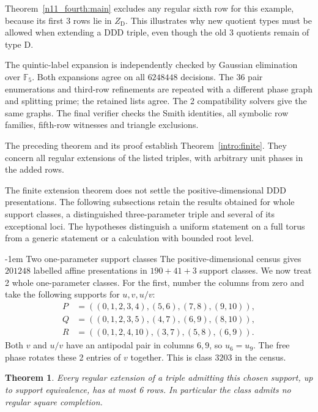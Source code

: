 \documentclass[11pt,a4paper]{article}
\makeatletter
\newtheorem{theorem}{Theorem}[section]
\theoremstyle{plain}
\theoremstyle{definition}
\theoremstyle{plain}
\renewcommand\subsection{\@startsection{subsection}{2}{\z@}  {\medskipamount}  {-1em}  {\normalfont\normalsize\bfseries}}
\makeatother
\begin{document}
Theorem~\ref{n11_fourth:main} excludes any regular sixth row for this example, because its first 3 rows lie in $Z_{\mathrm D}$. This illustrates why new quotient types must be allowed when extending a $\mathrm{DDD}$ triple, even though the old 3 quotients remain of type $\mathrm{D}$.

\medskip

The quintic-label expansion is independently checked by Gaussian elimination over $\mathbb F_5$. Both expansions agree on all $6248448$ decisions. The $36$ pair enumerations and third-row refinements are repeated with a different phase graph and splitting prime; the retained lists agree. The 2 compatibility solvers give the same graphs. The final verifier checks the Smith identities, all symbolic row families, fifth-row witnesses and triangle exclusions.

The preceding theorem and its proof establish Theorem~\ref{intro:finite}. They concern all regular extensions of the listed triples, with arbitrary unit phases in the added rows.

\medskip
The finite extension theorem does not settle the positive-dimensional $\mathrm{DDD}$ presentations. The following subsections retain the results obtained for whole support classes, a distinguished three-parameter triple and several of its exceptional loci. The hypotheses distinguish a uniform statement on a full torus from a generic statement or a calculation with bounded root level.

\subsection{Two one-parameter support classes}\label{sec:DDDOne}
The positive-dimensional census gives $201248$ labelled affine presentations in $190+41+3$ support classes. We now treat 2 whole one-parameter classes. For the first, number the columns from zero and take the following supports for $u,v,u/v$:
$$\begin{aligned}
P&=((0,1,2,3,4),(5,6),(7,8),(9,10)),\\
Q&=((0,1,2,3,5),(4,7),(6,9),(8,10)),\\
R&=((0,1,2,4,10),(3,7),(5,8),(6,9)).
\end{aligned}$$
Both $v$ and $u/v$ have an antipodal pair in columns $6,9$, so $u_6=u_9$. The free phase rotates these 2 entries of $v$ together. This is class $3203$ in the census.

\par\addvspace{\medskipamount}\noindent
\begin{minipage}{\linewidth}
\begin{theorem}\label{ddd_one:bound}
Every regular extension of a triple admitting this chosen support, up to support equivalence, has at most 6 rows. In particular the class admits no regular square completion.
\end{theorem}
\end{minipage}
\par\addvspace{\medskipamount}
\end{document}
